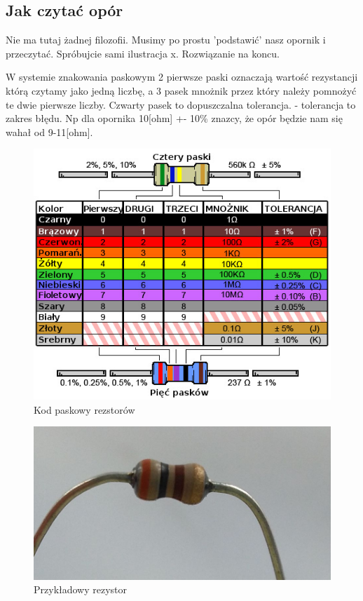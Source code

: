 	\subsection{Jak czytać opór}
Nie ma tutaj żadnej filozofii. Musimy po prostu 'podstawić' nasz opornik i przeczytać. Spróbujcie sami ilustracja x. Rozwiązanie na koncu.

W systemie znakowania paskowym 2 pierwsze paski oznaczają wartość rezystancji którą czytamy jako jedną liczbę, a 3 pasek mnożnik przez który należy pomnożyć te dwie pierwsze liczby.
Czwarty pasek to dopuszczalna tolerancja. - tolerancja to zakres błędu. Np dla opornika 10[ohm] +- 10\% znazcy, że opór będzie nam się wahał od 9-11[ohm].
\begin{figure}
 \centering
  \includegraphics[scale=0.7]{kod_paskowy.jpg}
  \caption{Kod paskowy rezstorów}
  \label{fig:test}
\end{figure}
\begin{figure}
 \centering
  \includegraphics[scale=0.4]{opornik.jpg}
  \caption{Przykładowy rezystor}
  \label{fig:test}
\end{figure}
\FloatBarrier

